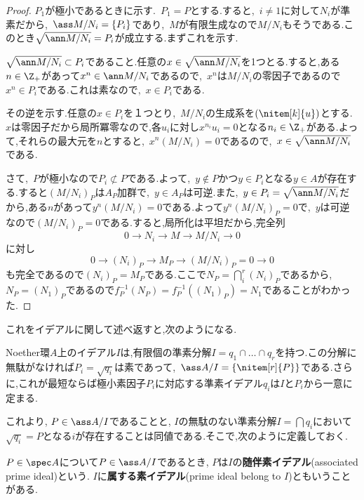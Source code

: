 \begin{proof}
	$ P_1$が極小であるときに示す.~$ P_1= P$とする.すると,~$i\neq1$に対して$N_i$が準素だから,~$\ass M/N_i=\{ P_i\}$であり,~$M$が有限生成なので$M/N_i$もそうである.このとき$\sqrt{\ann M/N_i}= P_i$が成立する.まずこれを示す.
	\begin{step}
		\item $\sqrt{\ann M/N_i}\subset P_i$であること.任意の$x\in\sqrt{\ann M/N_i}$を1つとる.すると,ある$n\in\Z_+$があって$x^n\in\ann M/N_i$であるので,~$x^n$は$M/N_i$の零因子であるので$x^n\in P_i$である.これは素なので,~$x\in P_i$である.
		
		\item その逆を示す.任意の$x\in P_i$を１つとり,~$M/N_i$の生成系を$(\nitem[k]{u})$とする.~$x$は零因子だから局所冪零なので,各$u_i$に対し$x^{n_i}u_i=0$となる$n_i\in\Z_+$がある.よって,それらの最大元を$n$とすると,~$x^n(M/N_i)=0$であるので,~$x\in\sqrt{\ann M/N_i}$である.
	\end{step}
	
	さて,~$ P$が極小なので$ P_i\not\subset P$である.よって,~$y\not\in P$かつ$y\in P_i$となる$y\in A$が存在する.すると$(M/N_i)_ P$は$A_ P$加群で,~$y\in A_ P$は可逆.また,~$y\in P_i=\sqrt{\ann M/N_i}$だから,ある$n$があって$y^n(M/N_i)=0$である.よって$y^n(M/N_i)_ P=0$で,~$y$は可逆なので$(M/N_i)_ P=0$である.すると,局所化は平坦だから,完全列
	\[0\longrightarrow N_i\longrightarrow M\longrightarrow M/N_i\longrightarrow0\]
	に対し
	\[0\longrightarrow (N_i)_ P\longrightarrow M_ P\longrightarrow (M/N_i)_ P=0\longrightarrow0\]
	も完全であるので$(N_i)_ P=M_ P$である.ここで$N_ P=\bigcap_i^r (N_i)_ P$であるから,~$N_ P=(N_1)_ P$であるので$f^{-1}_ P(N_ P)=f^{-1}_ P((N_1)_ P)=N_1$であることがわかった.
\end{proof}

これをイデアルに関して述べ返すと,次のようになる.
\begin{cor}\label{cor:イデアルの準素分解}
	Noether環$A$上のイデアル$I$は,有限個の準素分解$I= q_1\cap\dots\cap q_r$を持つ.この分解に無駄がなければ$P_i=\sqrt{ q_i}$は素であって,~$\ass A/I=\{\nitem[r]{P}\}$である.さらに,これが最短ならば極小素因子$P_i$に対応する準素イデアル$ q_i$は$I$と$ P_i$から一意に定まる.
\end{cor}

これより, $P\in\ass A/I$であることと, $I$の無駄のない準素分解$I=\bigcap q_i$において$\sqrt{q_i}=P$となる$i$が存在することは同値である.そこで,次のように定義しておく.

\begin{defi}[随伴素イデアル]
	$P\in\spec A$について$P\in\ass A/I$であるとき, $P$は$I$の\textbf{随伴素イデアル}(associated prime ideal)という. $I$に\textbf{属する素イデアル}(prime ideal belong to $I$)ともいうことがある.
\end{defi}


